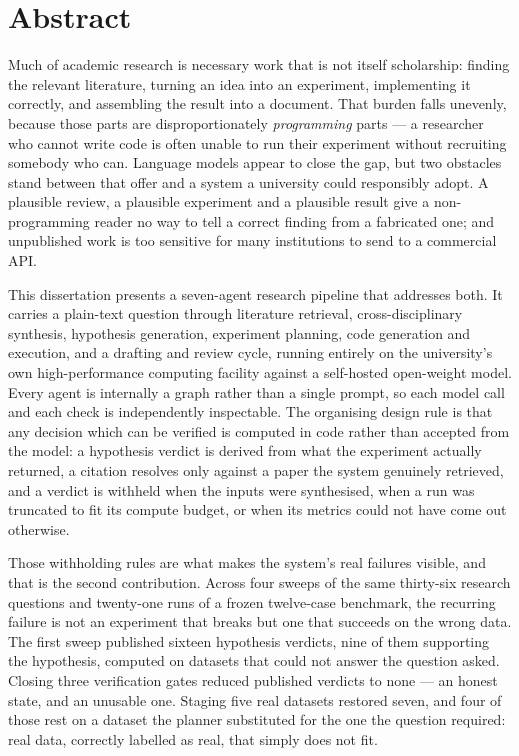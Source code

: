 \chapter*{Abstract}

Much of academic research is necessary work that is not itself scholarship:
finding the relevant literature, turning an idea into an experiment, implementing
it correctly, and assembling the result into a document. That burden falls
unevenly, because those parts are disproportionately \emph{programming} parts ---
a researcher who cannot write code is often unable to run their experiment
without recruiting somebody who can. Language models appear to close the gap, but
two obstacles stand between that offer and a system a university could
responsibly adopt. A plausible review, a plausible experiment and a plausible
result give a non-programming reader no way to tell a correct finding from a
fabricated one; and unpublished work is too sensitive for many institutions to
send to a commercial API.

This dissertation presents a seven-agent research pipeline that addresses both.
It carries a plain-text question through literature retrieval, cross-disciplinary
synthesis, hypothesis generation, experiment planning, code generation and
execution, and a drafting and review cycle, running entirely on the university's
own high-performance computing facility against a self-hosted open-weight model.
Every agent is internally a graph rather than a single prompt, so each model call
and each check is independently inspectable. The organising design rule is that
any decision which can be verified is computed in code rather than accepted from
the model: a hypothesis verdict is derived from what the experiment actually
returned, a citation resolves only against a paper the system genuinely
retrieved, and a verdict is withheld when the inputs were synthesised, when a run
was truncated to fit its compute budget, or when its metrics could not have come
out otherwise.

Those withholding rules are what makes the system's real failures visible, and
that is the second contribution. Across four sweeps of the same thirty-six
research questions and twenty-one runs of a frozen twelve-case benchmark, the
recurring failure is not an experiment that breaks but one that succeeds on the
wrong data. The first sweep published sixteen hypothesis verdicts, nine of them
supporting the hypothesis, computed on datasets that could not answer the
question asked. Closing three verification gates reduced published verdicts to
none --- an honest state, and an unusable one. Staging five real datasets
restored seven, and four of those rest on a dataset the planner substituted for
the one the question required: real data, correctly labelled as real, that simply
does not fit.

